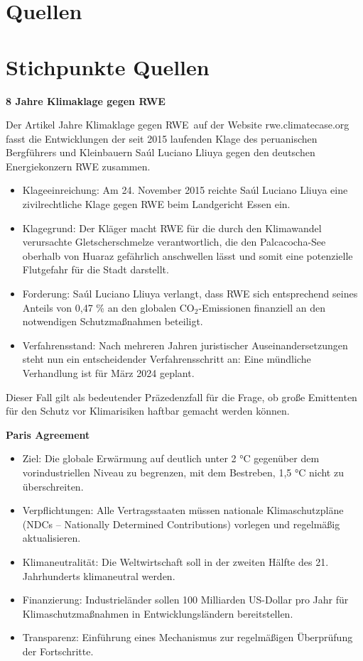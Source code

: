 \documentclass[a4paper, 12pt]{article} %
\begin{document}
\section{Quellen}

\clearpage

\section{Stichpunkte Quellen}

\textbf{\cite{8JahreKlimaklage} 8 Jahre Klimaklage gegen RWE}

Der Artikel  Jahre Klimaklage gegen RWE\grqq~auf der Website rwe.climatecase.org 
fasst die Entwicklungen der seit 2015 laufenden Klage des peruanischen Bergführers und Kleinbauern 
Saúl Luciano Lliuya gegen den deutschen Energiekonzern RWE zusammen. 

 \begin{itemize}
    \item Klageeinreichung: Am 24. November 2015 reichte Saúl Luciano Lliuya eine zivilrechtliche Klage gegen RWE beim Landgericht Essen ein.
    \item Klagegrund: Der Kläger macht RWE für die durch den Klimawandel verursachte Gletscherschmelze verantwortlich, die den Palcacocha-See oberhalb von Huaraz gefährlich anschwellen lässt und somit eine potenzielle Flutgefahr für die Stadt darstellt.
    \item Forderung: Saúl Luciano Lliuya verlangt, dass RWE sich entsprechend seines Anteils von 0,47 \% an den globalen CO$_2$-Emissionen finanziell an den notwendigen Schutzmaßnahmen beteiligt.
    \item Verfahrensstand: Nach mehreren Jahren juristischer Auseinandersetzungen steht nun ein entscheidender Verfahrensschritt an: Eine mündliche Verhandlung ist für März 2024 geplant.

 \end{itemize}

 Dieser Fall gilt als bedeutender Präzedenzfall für die Frage, ob große Emittenten für den Schutz vor Klimarisiken haftbar gemacht werden 
 können.

 \textbf{\cite{agreement2015paris} Paris Agreement}

 \begin{itemize}
    \item Ziel: Die globale Erwärmung auf deutlich unter 2 °C gegenüber dem vorindustriellen Niveau zu begrenzen, mit dem Bestreben, 1,5 °C nicht zu überschreiten.
    \item Verpflichtungen: Alle Vertragsstaaten müssen nationale Klimaschutzpläne (NDCs – Nationally Determined Contributions) vorlegen und regelmäßig aktualisieren.
    \item Klimaneutralität: Die Weltwirtschaft soll in der zweiten Hälfte des 21. Jahrhunderts klimaneutral werden.
    \item Finanzierung: Industrieländer sollen 100 Milliarden US-Dollar pro Jahr für Klimaschutzmaßnahmen in Entwicklungsländern bereitstellen.
    \item Transparenz: Einführung eines Mechanismus zur regelmäßigen Überprüfung der Fortschritte.
 \end{itemize}
\end{document}
